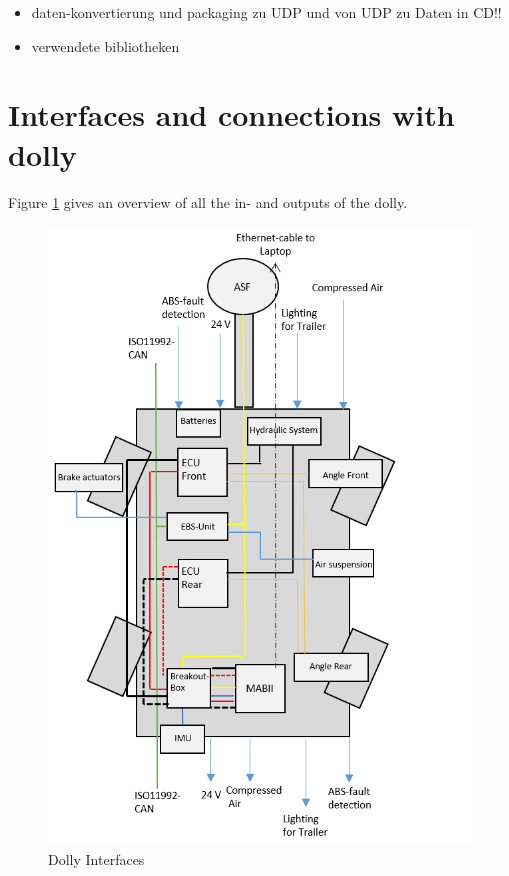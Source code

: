 \documentclass[ExampleMasters.tex]{subfiles}
\begin{document}
\begin{itemize}
	\item daten-konvertierung und packaging zu \gls{UDP} und von \gls{UDP} zu Daten in CD!!
	\item verwendete bibliotheken
\end{itemize}

\section{Interfaces and connections with dolly}
\label{sec:interface_with_dolly}
Figure \ref{fig:dolly_interfaces} gives an overview of all the in- and outputs of the dolly.\\

\begin{figure}[!htb]

	\includegraphics[width=1.3\linewidth]{figures/ExampleCover}
	\caption{Dolly Interfaces}
	\label{fig:dolly_interfaces}
\end{figure}
\end{document}
